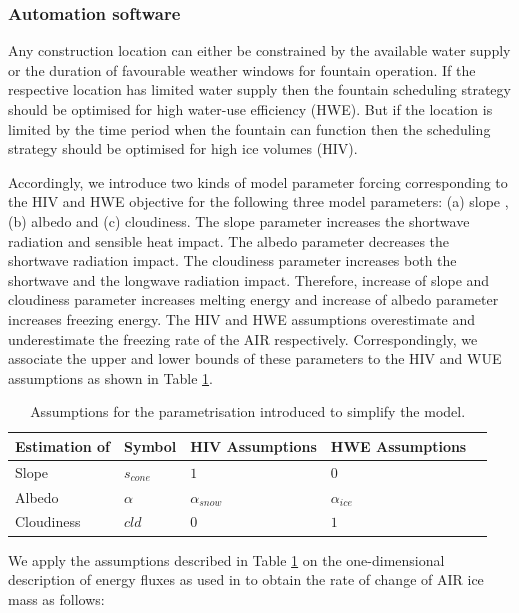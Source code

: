 \documentclass[tc, manuscript]{copernicus}
\begin{document}
\subsubsection{Automation software}

Any construction location can either be constrained by the available water supply or the duration of favourable
weather windows for fountain operation. If the respective location has limited water supply then the fountain
scheduling strategy should be optimised for high water-use efficiency (HWE). But if the location is limited by
the time period when the fountain can function then the scheduling strategy should be optimised for high ice
volumes (HIV).

Accordingly, we introduce two kinds of model parameter forcing corresponding to the HIV and HWE objective for
the following three model parameters: (a) slope , (b) albedo and (c) cloudiness. The slope parameter increases
the shortwave radiation and sensible heat impact. The albedo parameter decreases the shortwave radiation impact.
The cloudiness parameter increases both the shortwave and the longwave radiation impact. Therefore, increase of
slope and cloudiness parameter increases melting energy and increase of albedo parameter increases freezing
energy. The HIV and HWE assumptions overestimate and underestimate the freezing rate of the AIR respectively.
Correspondingly, we associate the upper and lower bounds of these parameters to the HIV and WUE assumptions as
shown in Table \ref{tab:assumptions}.

\begin{table}[]
\centering
\caption{Assumptions for the parametrisation introduced to simplify the model.}
\label{tab:assumptions}
\begin{tabular}{@{}lllll@{}}
\toprule
\textbf{Estimation of} & \textbf{Symbol} & \textbf{HIV Assumptions} & \textbf{HWE Assumptions} & \\ \midrule
\multicolumn{1}{|l}{Slope}        & $s_{cone}$ & $ 1 $ & $0$ & \multicolumn{1}{l|}{} \\ \midrule
\multicolumn{1}{|l}{Albedo} & $\alpha$ & $\alpha_{snow}$ & $\alpha_{ice}$ & \multicolumn{1}{l|}{} \\\midrule 
\multicolumn{1}{|l}{Cloudiness}  & $cld$ & $0$ & $1$ & \multicolumn{1}{l|}{} \\ \bottomrule
\end{tabular}
\end{table}

We apply the assumptions described in Table \ref{tab:assumptions} on the one-dimensional description of energy
fluxes as used in \cite{balasubramanianInfluenceMeteorologicalConditions2022} to obtain the rate of change of
AIR ice mass as follows: 
\end{document}
